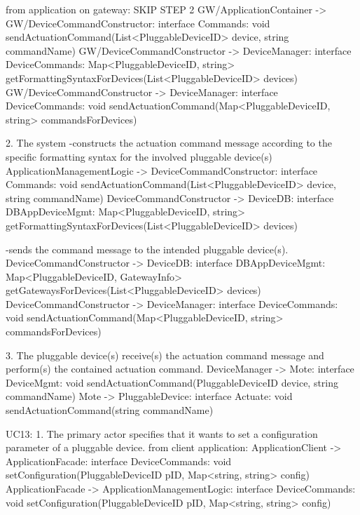                 from application on gateway: SKIP STEP 2
                    GW/ApplicationContainer -> GW/DeviceCommandConstructor: interface Commands: void sendActuationCommand(List<PluggableDeviceID> device, string commandName)
                    GW/DeviceCommandConstructor -> DeviceManager: interface DeviceCommands: Map<PluggableDeviceID, string> getFormattingSyntaxForDevices(List<PluggableDeviceID> devices)
                    GW/DeviceCommandConstructor -> DeviceManager: interface DeviceCommands: void sendActuationCommand(Map<PluggableDeviceID, string> commandsForDevices)


            2. The system
                -constructs the actuation command message according to the specific formatting syntax for the involved pluggable device(s)
                    ApplicationManagementLogic -> DeviceCommandConstructor:  interface Commands:  void sendActuationCommand(List<PluggableDeviceID> device, string commandName)
                    DeviceCommandConstructor -> DeviceDB: interface DBAppDeviceMgmt: Map<PluggableDeviceID, string> getFormattingSyntaxForDevices(List<PluggableDeviceID> devices)

                -sends the command message to the intended pluggable device(s).
                    DeviceCommandConstructor -> DeviceDB: interface DBAppDeviceMgmt: Map<PluggableDeviceID, GatewayInfo> getGatewaysForDevices(List<PluggableDeviceID> devices)
                    DeviceCommandConstructor -> DeviceManager: interface DeviceCommands: void sendActuationCommand(Map<PluggableDeviceID, string> commandsForDevices)

            3. The pluggable device(s) receive(s) the actuation command message and perform(s) the contained actuation command.
                    DeviceManager -> Mote: interface DeviceMgmt: void sendActuationCommand(PluggableDeviceID device, string commandName)
                    Mote -> PluggableDevice: interface Actuate:    void sendActuationCommand(string commandName)


        UC13:
            1. The primary actor specifies that it wants to set a configuration parameter of a pluggable device.
                from client application:
                    ApplicationClient -> ApplicationFacade:           interface DeviceCommands:       void setConfiguration(PluggableDeviceID pID, Map<string, string> config)
                    ApplicationFacade -> ApplicationManagementLogic: interface DeviceCommands:  void setConfiguration(PluggableDeviceID pID, Map<string, string> config)

